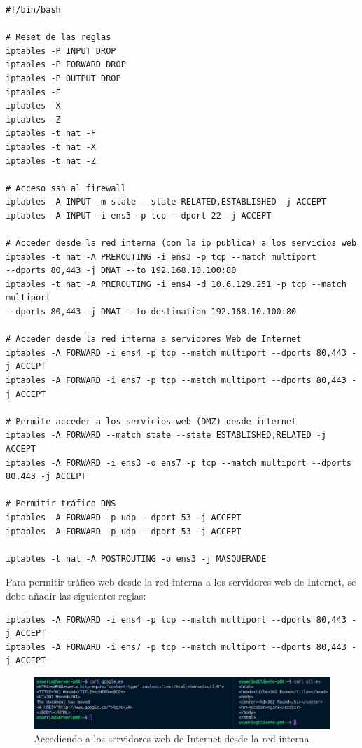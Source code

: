 \documentclass[11pt]{report} %
\begin{document}
\begin{verbatim}
#!/bin/bash

# Reset de las reglas
iptables -P INPUT DROP
iptables -P FORWARD DROP
iptables -P OUTPUT DROP
iptables -F
iptables -X
iptables -Z
iptables -t nat -F
iptables -t nat -X
iptables -t nat -Z

# Acceso ssh al firewall
iptables -A INPUT -m state --state RELATED,ESTABLISHED -j ACCEPT
iptables -A INPUT -i ens3 -p tcp --dport 22 -j ACCEPT

# Acceder desde la red interna (con la ip publica) a los servicios web
iptables -t nat -A PREROUTING -i ens3 -p tcp --match multiport 
--dports 80,443 -j DNAT --to 192.168.10.100:80 
iptables -t nat -A PREROUTING -i ens4 -d 10.6.129.251 -p tcp --match multiport 
--dports 80,443 -j DNAT --to-destination 192.168.10.100:80 

# Acceder desde la red interna a servidores Web de Internet
iptables -A FORWARD -i ens4 -p tcp --match multiport --dports 80,443 -j ACCEPT
iptables -A FORWARD -i ens7 -p tcp --match multiport --dports 80,443 -j ACCEPT

# Permite acceder a los servicios web (DMZ) desde internet
iptables -A FORWARD --match state --state ESTABLISHED,RELATED -j ACCEPT
iptables -A FORWARD -i ens3 -o ens7 -p tcp --match multiport --dports 80,443 -j ACCEPT

# Permitir tráfico DNS
iptables -A FORWARD -p udp --dport 53 -j ACCEPT
iptables -A FORWARD -p udp --dport 53 -j ACCEPT

iptables -t nat -A POSTROUTING -o ens3 -j MASQUERADE
\end{verbatim}

\cleardoublepage

Para permitir tráfico web desde la red interna a los servidores web de Internet, se debe añadir las siguientes reglas:
\begin{verbatim}
iptables -A FORWARD -i ens4 -p tcp --match multiport --dports 80,443 -j ACCEPT
iptables -A FORWARD -i ens7 -p tcp --match multiport --dports 80,443 -j ACCEPT
\end{verbatim}

\begin{figure}[H]
  \centering
  \includegraphics[scale=0.4]{img/web_internet.png}
  \caption{Accediendo a los servidores web de Internet desde la red interna}
  \label{fig:permitir tráfico web desde la red interna a los servidores web de Internet}
\end{figure}
\end{document}
